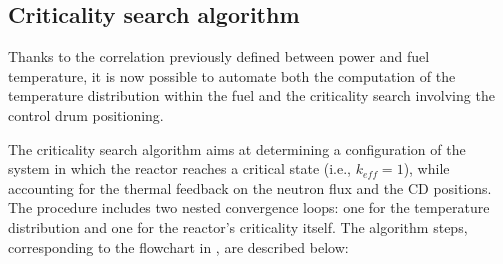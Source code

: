 \documentclass[preprint,review,12pt]{elsarticle}
\begin{document}
\subsection{Criticality search algorithm}
\label{subsec:criticality_search_method}
Thanks to the correlation previously defined between power and fuel temperature, it is now possible to automate both the computation of the temperature distribution within the fuel and the criticality search involving the control drum positioning.

The criticality search algorithm aims at determining a configuration of the system in which the reactor reaches a critical state (i.e., $k_{eff} = 1$), while accounting for the thermal feedback on the neutron flux and the CD positions. The procedure includes two nested convergence loops: one for the temperature distribution and one for the reactor's criticality itself. The algorithm steps, corresponding to the flowchart in , are described below:





\end{document}
